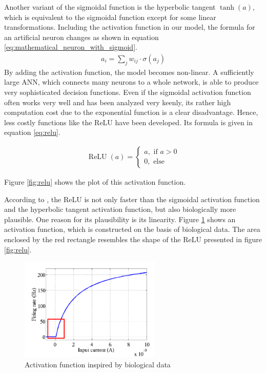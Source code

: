 \documentclass[11pt, a4paper]{article}
\begin{document}
Another variant of the sigmoidal function is the hyperbolic tangent $\tanh(a)$, which is equivalent to the sigmoidal function except for some linear transformations.
Including the activation function in our model, the formula for an artificial neuron changes as shown in equation \eqref{eq:mathematical_neuron_with_sigmoid}.
\begin{align}
\label{eq:mathematical_neuron_with_sigmoid}
a_i = \sum_j w_{ij} \cdot \sigma(a_j)
\end{align}
By adding the activation function, the model becomes non-linear. A sufficiently large \ac{ANN}, which connects many neurons to a whole network, is able to produce very sophisticated decision functions. Even if the sigmoidal activation function often works very well and has been analyzed very keenly, its rather high computation cost due to the exponential function is a clear disadvantage. Hence, less costly functions like the \ac{ReLU} have been developed. Its formula is given in equation \eqref{eq:relu}.

\begin{align}
\label{eq:relu}
\operatorname{ReLU}(a) = \begin{cases}a, \text{ if } a > 0\\0, \text{ else}\end{cases}
\end{align}

Figure \ref{fig:relu} shows the plot of this activation function.



According to \cite{dsrnn}, the \ac{ReLU} is not only faster than the sigmoidal activation function and the hyperbolic tangent activation function, but also biologically more plausible. One reason for its plausibility is its linearity. Figure \ref{fig:biological_activation_function} shows an activation function, which is constructed on the basis of biological data. The area enclosed by the red rectangle resembles the shape of the \ac{ReLU} presented in figure \ref{fig:relu}.


\begin{figure}[htbp]
	\centering
	\includegraphics[width=0.6\textwidth]{biological_activation_function.png}
	\caption[Activation function inspired by biological data]{Activation function inspired by biological data\footnotemark}
	\label{fig:biological_activation_function}
\end{figure}
\end{document}
